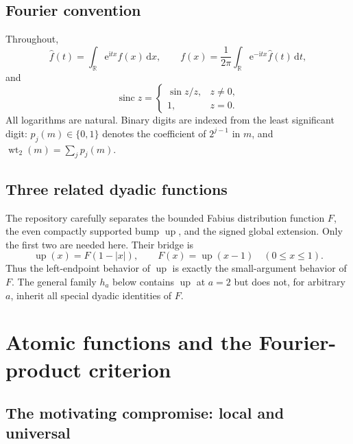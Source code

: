 \documentclass[11pt,oneside]{article}
\theoremstyle{definition}
\theoremstyle{remark}
\newcommand{\R}{\mathbb R}
\newcommand{\Up}{\operatorname{up}}
\newcommand{\sinc}{\operatorname{sinc}}
\newcommand{\e}{\mathrm e}
\newcommand{\ii}{\mathrm i}
\newcommand{\dd}{\,\mathrm d}
\newcommand{\wt}{\operatorname{wt}_2}
\begin{document}
\subsection{Fourier convention}

Throughout,
\begin{equation}
 \widehat f(t)=\int_{\R}\e^{\ii tx}f(x)\dd x,
 \qquad
 f(x)=\frac1{2\pi}\int_{\R}\e^{-\ii tx}\widehat f(t)\dd t,
 \label{eq:fourier-convention}
\end{equation}
and
\[
 \sinc z=\begin{cases}\sin z/z,&z\ne0,\\1,&z=0.\end{cases}
\]
All logarithms are natural.  Binary digits are indexed from the least significant digit:
$p_j(m)\in\{0,1\}$ denotes the coefficient of $2^{j-1}$ in $m$, and
$\wt(m)=\sum_jp_j(m)$.

\subsection{Three related dyadic functions}

The repository carefully separates the bounded Fabius distribution function $F$, the even
compactly supported bump $\Up$, and the signed global extension.  Only the first two are
needed here.  Their bridge is
\begin{equation}
 \Up(x)=F(1-|x|),\qquad F(x)=\Up(x-1)\quad(0\le x\le1).
 \label{eq:F-up-bridge}
\end{equation}
Thus the left-endpoint behavior of $\Up$ is exactly the small-argument behavior of $F$.  The
general family $h_a$ below contains $\Up$ at $a=2$ but does not, for arbitrary $a$, inherit all
special dyadic identities of $F$.

\section{Atomic functions and the Fourier-product criterion}
\label{sec:general-atomic}

\subsection{The motivating compromise: local and universal}
\end{document}
